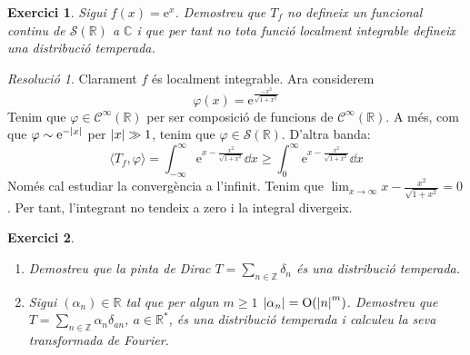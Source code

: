 \documentclass[10pt,a4paper]{article}
\newcommand{\ZZ}{\ensuremath{\mathbb{Z}}} %
\newcommand{\RR}{\ensuremath{\mathbb{R}}} %
\newcommand{\CC}{\ensuremath{\mathbb{C}}} %
\renewcommand{\O}{\mathrm{O}} %
\newtheorem{exercici}{Exercici}
\theoremstyle{definition}
\theoremstyle{remark}
\newtheorem*{res}{Resolució}
\renewcommand{\exp}[1]{\mathrm{e}^{#1}} %
\begin{document}
\begin{exercici}
  Sigui $f(x)=\exp{x}$. Demostreu que $T_f$ no defineix un funcional continu de $\mathcal{S}(\RR)$ a $\CC$ i que per tant no tota funció localment integrable defineix una distribució temperada.
\end{exercici}
\begin{res}
  Clarament $f$ és localment integrable. Ara considerem
  $$
    \varphi(x)=\exp{\frac{-x^2}{\sqrt{1+x^2}}}
  $$
  Tenim que $\varphi\in\mathcal{C}^\infty(\RR)$ per ser composició de funcions de $\mathcal{C}^\infty(\RR)$. A més, com que $\varphi\sim \exp{-\abs{x}}$ per $\abs{x}\gg1$, tenim que $\varphi\in\mathcal{S}(\RR)$. D'altra banda:
  $$
    \langle T_f, \varphi\rangle=\int_{-\infty}^\infty\exp{x-\frac{x^2}{\sqrt{1+x^2}}}\dd{x}\geq \int_{0}^\infty\exp{x-\frac{x^2}{\sqrt{1+x^2}}}\dd{x}
  $$
  Només cal estudiar la convergència a l'infinit. Tenim que $\displaystyle\lim_{x\to\infty} x-\frac{x^2}{\sqrt{1+x^2}}=0$. Per tant, l'integrant no tendeix a zero i la integral divergeix.
\end{res}
\begin{exercici}\hfill
  \begin{enumerate}
    \item Demostreu que la pinta de Dirac $T=\sum_{n\in\ZZ}\delta_n$ és una distribució temperada.
    \item Sigui $(\alpha_n)\in\RR$ tal que per algun $m\geq1$ $\abs{\alpha_n}=\O({\abs{n}^{m}})$. Demostreu que $T=\sum_{n\in\ZZ}\alpha_n\delta_{an}$, $a\in\RR^*$, és una distribució temperada i calculeu la seva transformada de Fourier.
  \end{enumerate}
\end{exercici}
\end{document}
